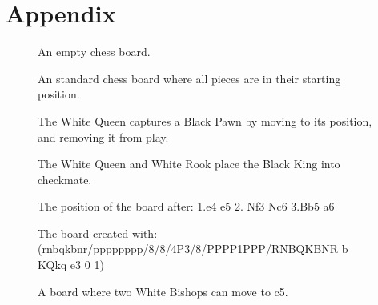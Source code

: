 \documentclass[12pt, a4paper, bibliography=totocnumbered]{scrreprt}
\begin{document}




\chapter{Appendix}

\begin{figure}
    \showboard
    \caption{An empty chess board.}
    \label{chessboard}
\end{figure}

\begin{figure}
    \newgame
    \showboard
    \caption{An standard chess board where all pieces are in their starting position.}
    \label{startboard}
\end{figure}

\begin{figure}
    \showboard
    \quad
    \showboard
    \caption{The White Queen captures a Black Pawn by moving to its position, and removing it from play.}
    \label{capture}
\end{figure}

\begin{figure}
    \showboard
    \caption{The White Queen and White Rook place the Black King into checkmate.}
    \label{checkmate}
\end{figure}

\begin{figure}
    \newgame
    \showboard
    \caption{The position of the board after: 1.e4 e5 2. Nf3 Nc6 3.Bb5 a6}
    \label{algebraicexample}
\end{figure}

\begin{figure}
    \showboard
    \caption{The board created with: (rnbqkbnr/pppppppp/8/8/4P3/8/PPPP1PPP/RNBQKBNR b KQkq e3 0 1)}
    \label{fenexample}
\end{figure}

\begin{figure}
    \showboard
    \caption{A board where two White Bishops can move to c5.}
    \label{twobishops}
\end{figure}
\end{document}
